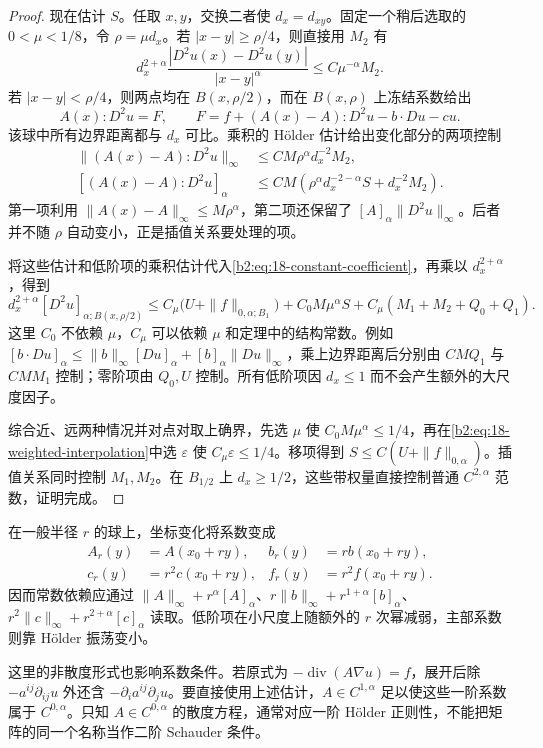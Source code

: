 \begin{proof}
现在估计 \(S\)。任取 \(x,y\)，交换二者使 \(d_x=d_{xy}\)。固定一个稍后选取的 \(0<\mu<1/8\)，令 \(\rho=\mu d_x\)。若 \(|x-y|\ge\rho/4\)，则直接用 \(M_2\) 有
\[
 d_x^{2+\alpha}\frac{|D^2u(x)-D^2u(y)|}{|x-y|^\alpha}
 \le C\mu^{-\alpha}M_2.
\]
若 \(|x-y|<\rho/4\)，则两点均在 \(B(x,\rho/2)\)，而在 \(B(x,\rho)\) 上冻结系数给出
\[
 A(x):D^2u=F,
 \qquad F=f+(A(x)-A):D^2u-b\cdot Du-cu.
\]
该球中所有边界距离都与 \(d_x\) 可比。乘积的 Hölder 估计给出变化部分的两项控制
\begin{align*}
 \|(A(x)-A):D^2u\|_\infty
     &\le C M\rho^\alpha d_x^{-2}M_2,\\
 [(A(x)-A):D^2u]_\alpha
     &\le C M\left(\rho^\alpha d_x^{-2-\alpha}S+d_x^{-2}M_2\right).
\end{align*}
第一项利用 \(\|A(x)-A\|_\infty\le M\rho^\alpha\)，第二项还保留了 \([A]_\alpha\|D^2u\|_\infty\)。后者并不随 \(\rho\) 自动变小，正是插值关系要处理的项。

将这些估计和低阶项的乘积估计代入\eqref{b2:eq:18-constant-coefficient}，再乘以 \(d_x^{2+\alpha}\)，得到
\[
 d_x^{2+\alpha}[D^2u]_{\alpha;B(x,\rho/2)}
 \le C_\mu\bigl(U+\|f\|_{0,\alpha;B_1}\bigr)
       +C_0 M\mu^\alpha S
       +C_\mu(M_1+M_2+Q_0+Q_1).
\]
这里 \(C_0\) 不依赖 \(\mu\)，\(C_\mu\) 可以依赖 \(\mu\) 和定理中的结构常数。例如 \([b\cdot Du]_\alpha\le\|b\|_\infty[Du]_\alpha+[b]_\alpha\|Du\|_\infty\)，乘上边界距离后分别由 \(C M Q_1\) 与 \(C M M_1\) 控制；零阶项由 \(Q_0,U\) 控制。所有低阶项因 \(d_x\le1\) 而不会产生额外的大尺度因子。

综合近、远两种情况并对点对取上确界，先选 \(\mu\) 使 \(C_0M\mu^\alpha\le1/4\)，再在\eqref{b2:eq:18-weighted-interpolation}中选 \(\varepsilon\) 使 \(C_\mu\varepsilon\le1/4\)。移项得到 \(S\le C(U+\|f\|_{0,\alpha})\)。插值关系同时控制 \(M_1,M_2\)。在 \(B_{1/2}\) 上 \(d_x\ge1/2\)，这些带权量直接控制普通 \(C^{2,\alpha}\) 范数，证明完成。
\end{proof}

在一般半径 \(r\) 的球上，坐标变化将系数变成
\[
 \begin{aligned}
 A_r(y)&=A(x_0+ry),& b_r(y)&=r b(x_0+ry),\\
 c_r(y)&=r^2c(x_0+ry),& f_r(y)&=r^2f(x_0+ry).
 \end{aligned}
\]
因而常数依赖应通过 \(\|A\|_\infty+r^\alpha[A]_\alpha\)、\(r\|b\|_\infty+r^{1+\alpha}[b]_\alpha\)、\(r^2\|c\|_\infty+r^{2+\alpha}[c]_\alpha\) 读取。低阶项在小尺度上随额外的 \(r\) 次幂减弱，主部系数则靠 Hölder 振荡变小。

\ProseParagraphBreak
这里的非散度形式也影响系数条件。若原式为 \(-\operatorname{div}(A\nabla u)=f\)，展开后除 \(-a^{ij}\partial_{ij}u\) 外还含 \(-\partial_i a^{ij}\partial_j u\)。要直接使用上述估计，\(A\in C^{1,\alpha}\) 足以使这些一阶系数属于 \(C^{0,\alpha}\)。只知 \(A\in C^{0,\alpha}\) 的散度方程，通常对应一阶 Hölder 正则性，不能把矩阵的同一个名称当作二阶 Schauder 条件。

